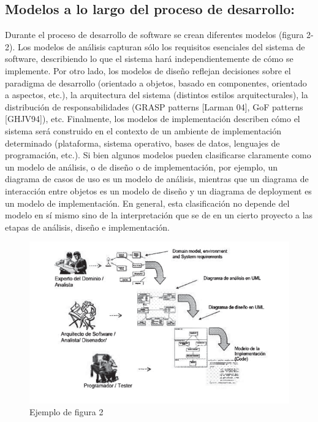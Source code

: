 \subsection{Modelos a lo largo del proceso de desarrollo:}
Durante el proceso de desarrollo de software se crean diferentes modelos (figura 2-2). Los modelos de análisis capturan sólo los requisitos esenciales del sistema de software, describiendo lo que el sistema hará independientemente de cómo se implemente. Por otro lado, los modelos de diseño reflejan decisiones sobre el paradigma de desarrollo (orientado a objetos, basado en componentes, orientado a aspectos, etc.), la arquitectura del sistema (distintos estilos arquitecturales), la distribución de responsabilidades (GRASP patterns [Larman 04], GoF patterns [GHJV94]), etc. Finalmente, los modelos de implementación describen cómo el sistema será construido en el contexto de un ambiente de implementación determinado (plataforma, sistema operativo, bases de datos, lenguajes de programación, etc.). Si bien algunos modelos pueden clasificarse claramente como un modelo de análisis, o de diseño o de implementación, por ejemplo, un diagrama de casos de uso es un modelo de análisis, mientras que un diagrama de interacción entre objetos es un modelo de diseño y un diagrama de deployment es un modelo de implementación. En general, esta clasificación no depende del modelo en sí mismo sino de la interpretación que se de en un cierto proyecto a las etapas de análisis, diseño e implementación.
\begin{figure}[H]
\centering
\includegraphics[scale=0.9]{./Imagenes/modelo2}
\caption{Ejemplo de figura 2}
\label{figura2}
\end{figure}

